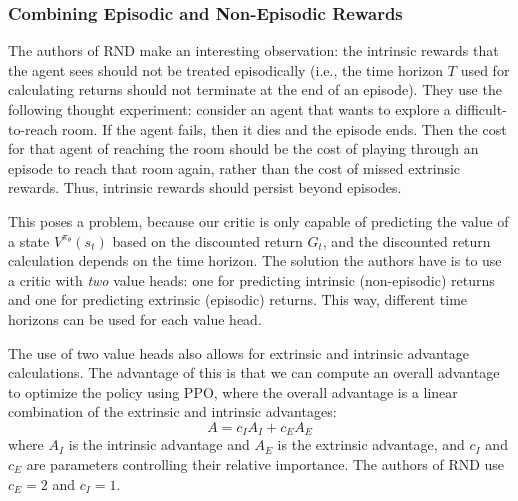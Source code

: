 \documentclass[journal, onecolumn, 12pt, draftclsnofoot]{IEEEtran}
\begin{document}
	\subsubsection{Combining Episodic and Non-Episodic Rewards}
	\par The authors of RND make an interesting observation: the intrinsic rewards that the agent sees should not be treated episodically (i.e., the time horizon $T$ used for calculating returns should not terminate at the end of an episode). They use the following thought experiment: consider an agent that wants to explore a difficult-to-reach room. If the agent fails, then it dies and the episode ends. Then the cost for that agent of reaching the room should be the cost of playing through an episode to reach that room again, rather than the cost of missed extrinsic rewards. Thus, intrinsic rewards should persist beyond episodes.
	\par This poses a problem, because our critic is only capable of predicting the value of a state $V^{\pi_\theta}(s_t)$ based on the discounted return $G_t$, and the discounted return calculation depends on the time horizon. The solution the authors have is to use a critic with \textit{two} value heads: one for predicting intrinsic (non-episodic) returns and one for predicting extrinsic (episodic) returns. This way, different time horizons can be used for each value head.
	\par The use of two value heads also allows for extrinsic and intrinsic advantage calculations. The advantage of this is that we can compute an overall advantage to optimize the policy using PPO, where the overall advantage is a linear combination of the extrinsic and intrinsic advantages:
	\begin{equation}
		\label{eqn:advantage-linear-combination}
		A = c_I A_I + c_E A_E
	\end{equation}
	where $A_I$ is the intrinsic advantage and $A_E$ is the extrinsic advantage, and $c_I$ and $c_E$ are parameters controlling their relative importance. The authors of RND use $c_E = 2$ and $c_I = 1$.
\end{document}
